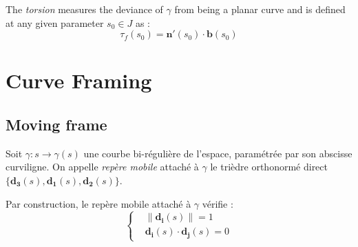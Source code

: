 The \emph{torsion} measures the deviance of $\gamma$ from being a planar curve and is defined at any given parameter $s_0 \in J$ as :
\begin{equation}
\tau_f(s_0) = \mathbf{n}'(s_0) \cdot \mathbf{b}(s_0) 
\end{equation}






\section{Curve Framing}

\subsection{Moving frame}

Soit $\gamma : s \rightarrow \gamma(s)$ une courbe bi-régulière de l'espace, paramétrée par son abscisse curviligne. On appelle \emph{repère mobile} attaché à $\gamma$ le trièdre orthonormé direct 
$\{\mathbf{d_{3}}(s),\mathbf{d_{1}}(s),\mathbf{d_{2}}(s) \}$. 

Par construction, le repère mobile attaché à $\gamma$ vérifie :
\begin{equation}
\begin{cases}
&\| \mathbf{d_{i}}(s) \| = 1 \\
&\mathbf{d_{i}}(s) \cdot \mathbf{d_{j}}(s) = 0
\end{cases}
\end{equation}

